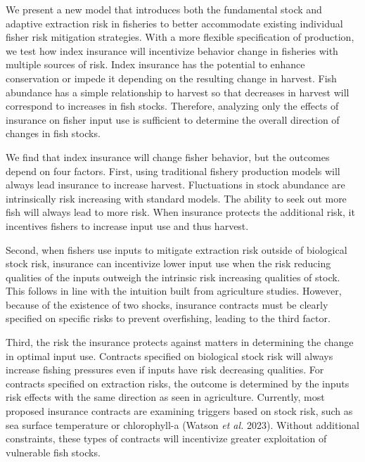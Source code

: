 \documentclass[
  letterpaper,
  DIV=11,
  numbers=noendperiod]{scrartcl}
\theoremstyle{plain}
\theoremstyle{plain}
\theoremstyle{remark}
\begin{document}
We present a new model that introduces both the fundamental stock and
adaptive extraction risk in fisheries to better accommodate existing
individual fisher risk mitigation strategies. With a more flexible
specification of production, we test how index insurance will
incentivize behavior change in fisheries with multiple sources of risk.
Index insurance has the potential to enhance conservation or impede it
depending on the resulting change in harvest. Fish abundance has a
simple relationship to harvest so that decreases in harvest will
correspond to increases in fish stocks. Therefore, analyzing only the
effects of insurance on fisher input use is sufficient to determine the
overall direction of changes in fish stocks.

We find that index insurance will change fisher behavior, but the
outcomes depend on four factors. First, using traditional fishery
production models will always lead insurance to increase harvest.
Fluctuations in stock abundance are intrinsically risk increasing with
standard models. The ability to seek out more fish will always lead to
more risk. When insurance protects the additional risk, it incentives
fishers to increase input use and thus harvest.

Second, when fishers use inputs to mitigate extraction risk outside of
biological stock risk, insurance can incentivize lower input use when
the risk reducing qualities of the inputs outweigh the intrinsic risk
increasing qualities of stock. This follows in line with the intuition
built from agriculture studies. However, because of the existence of two
shocks, insurance contracts must be clearly specified on specific risks
to prevent overfishing, leading to the third factor.

Third, the risk the insurance protects against matters in determining
the change in optimal input use. Contracts specified on biological stock
risk will always increase fishing pressures even if inputs have risk
decreasing qualities. For contracts specified on extraction risks, the
outcome is determined by the inputs risk effects with the same direction
as seen in agriculture. Currently, most proposed insurance contracts are
examining triggers based on stock risk, such as sea surface temperature
or chlorophyll-a (Watson \emph{et al.} 2023). Without additional
constraints, these types of contracts will incentivize greater
exploitation of vulnerable fish stocks.
\end{document}
